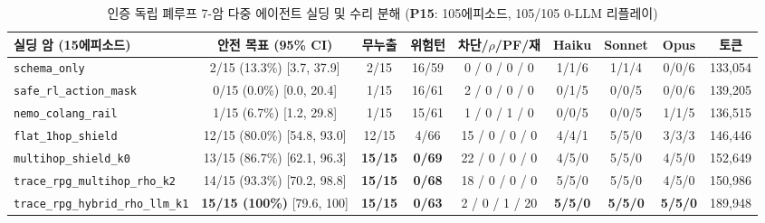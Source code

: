 \begin{table}[!tbp]
\caption{인증 독립 폐루프 7-암 다중 에이전트 실딩 및 수리 분해 (\textbf{P15}: 105에피소드, 105/105 0-LLM 리플레이)}
\label{tab:kbs-mas}
\centering
\scriptsize
\setlength{\tabcolsep}{3.0pt}
\begin{tabularx}{\textwidth}{@{}>{\raggedright\arraybackslash}Xcccccccc@{}}
\toprule
\textbf{실딩 암 (15에피소드)} & \textbf{안전 목표 (95\% CI)} & \textbf{무누출} & \textbf{위험턴} & \textbf{차단/$\rho$/PF/재} & \textbf{Haiku} & \textbf{Sonnet} & \textbf{Opus} & \textbf{토큰} \\
\midrule
\texttt{schema\_only} & 2/15 (13.3\%) [3.7, 37.9] & 2/15 & 16/59 & 0 / 0 / 0 / 0 & 1/1/6 & 1/1/4 & 0/0/6 & 133,054 \\
\texttt{safe\_rl\_action\_mask}~\cite{alshiekh2018shield} & 0/15 (0.0\%) [0.0, 20.4] & 1/15 & 16/61 & 2 / 0 / 0 / 0 & 0/1/5 & 0/0/5 & 0/0/6 & 139,205 \\
\texttt{nemo\_colang\_rail}~\cite{rebedea2023nemo} & 1/15 (6.7\%) [1.2, 29.8] & 1/15 & 15/61 & 1 / 0 / 1 / 0 & 0/0/5 & 0/0/5 & 1/1/5 & 136,515 \\
\texttt{flat\_1hop\_shield} & 12/15 (80.0\%) [54.8, 93.0] & 12/15 & 4/66 & 15 / 0 / 0 / 0 & 4/4/1 & 5/5/0 & 3/3/3 & 146,446 \\
\texttt{multihop\_shield\_k0} & 13/15 (86.7\%) [62.1, 96.3] & \textbf{15/15} & \textbf{0/69} & 22 / 0 / 0 / 0 & 4/5/0 & 5/5/0 & 4/5/0 & 152,649 \\
\texttt{trace\_rpg\_multihop\_rho\_k2} & 14/15 (93.3\%) [70.2, 98.8] & \textbf{15/15} & \textbf{0/68} & 18 / 0 / 0 / 0 & 5/5/0 & 5/5/0 & 4/5/0 & 150,986 \\
\texttt{trace\_rpg\_hybrid\_rho\_llm\_k1} & \textbf{15/15 (100\%)} [79.6, 100] & \textbf{15/15} & \textbf{0/63} & 2 / 0 / 1 / 20 & \textbf{5/5/0} & \textbf{5/5/0} & \textbf{5/5/0} & 189,948 \\
\bottomrule
\end{tabularx}
\end{table}
